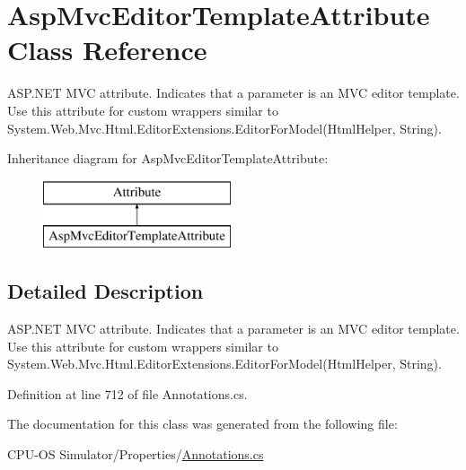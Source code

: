 \hypertarget{class_asp_mvc_editor_template_attribute}{}\section{Asp\+Mvc\+Editor\+Template\+Attribute Class Reference}
\label{class_asp_mvc_editor_template_attribute}


A\+S\+P.\+N\+E\+T M\+V\+C attribute. Indicates that a parameter is an M\+V\+C editor template. Use this attribute for custom wrappers similar to {\ttfamily System.\+Web.\+Mvc.\+Html.\+Editor\+Extensions.\+Editor\+For\+Model(\+Html\+Helper, String)}.  


Inheritance diagram for Asp\+Mvc\+Editor\+Template\+Attribute\+:\begin{figure}[H]
\begin{center}
\leavevmode
\includegraphics[height=2.000000cm]{class_asp_mvc_editor_template_attribute}
\end{center}
\end{figure}


\subsection{Detailed Description}
A\+S\+P.\+N\+E\+T M\+V\+C attribute. Indicates that a parameter is an M\+V\+C editor template. Use this attribute for custom wrappers similar to {\ttfamily System.\+Web.\+Mvc.\+Html.\+Editor\+Extensions.\+Editor\+For\+Model(\+Html\+Helper, String)}. 



Definition at line 712 of file Annotations.\+cs.



The documentation for this class was generated from the following file\+:\begin{DoxyCompactItemize}
\item 
C\+P\+U-\/\+O\+S Simulator/\+Properties/\hyperlink{_annotations_8cs}{Annotations.\+cs}\end{DoxyCompactItemize}
